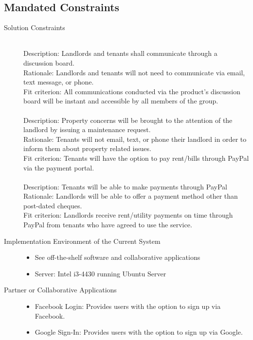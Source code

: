 \documentclass[12pt, titlepage]{article}
\begin{document}
\subsection{Mandated Constraints} 
\begin{description}
  \item[Solution Constraints] \hfill \\
    Description: Landlords and tenants shall communicate through a discussion
    board. \\
    Rationale: Landlords and tenants will not need to communicate via email,
    text message, or phone. \\
    Fit criterion: All communications conducted via the product's discussion
    board will be instant and accessible by all members of the group. \\
    \\
    Description: Property concerns will be brought to the attention of the
    landlord by issuing a maintenance request. \\
    Rationale: Tenants will not email, text, or phone their landlord in order
    to inform them about property related issues. \\
    Fit criterion: Tenants will have the option to pay rent/bills through
    PayPal via the payment portal. \\
    \\
    Description: Tenants will be able to make payments through PayPal
    Rationale: Landlords will be able to offer a payment method other than
    post-dated cheques. \\
    Fit criterion: Landlords receive rent/utility payments on time through
    PayPal from tenants who have agreed to use the service. \\
  \item[Implementation Environment of the Current System] \hfill 
    \begin{itemize}
      \item See off-the-shelf software and collaborative applications
      \item Server: Intel i3-4430 running Ubuntu Server \\
    \end{itemize}
  \item[Partner or Collaborative Applications] \hfil 
    \begin{itemize}
    \item Facebook Login: Provides users with the option to sign up via 
Facebook.
    \item Google Sign-In: Provides users with the option to sign up via Google.

\end{itemize}
\end{description}
\end{document}
